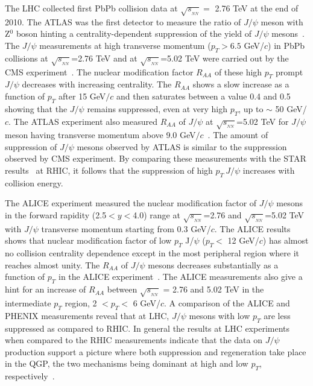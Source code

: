 \documentclass[12pt,a4paper,final]{iopart} %
\newcommand{\Jpsi}{J/\psi}
\newcommand{\pT}{p_{T}}
\newcommand{\sNN}{\sqrt{s_{_{NN}}}}
\begin{document}
The LHC collected first PbPb collision data at $\sNN =$ 2.76 TeV at the end of 2010.
The ATLAS was the first detector to measure 
the ratio of $\Jpsi$ meson with Z$^{0}$ boson hinting a centrality-dependent suppression
of the yield of $\Jpsi$ mesons~\cite{Aad:2010aa}.
 The $\Jpsi$ measurements at high transverse momentum ($p_T>6.5$ GeV/$c$) in PbPb collisions at $\sNN$=2.76 TeV and at
$\sNN$=5.02 TeV were carried out by the CMS experiment~\cite{Chatrchyan:2012np,Khachatryan:2016ypw,Sirunyan:2017isk}.
The nuclear modification factor $R_{AA}$ of these high $p_T$ prompt $\Jpsi$ decreases
with increasing centrality. The $R_{AA}$ shows a slow increase as a function of
$p_T$ after 15 GeV$/c$ and then saturates between a value 0.4 and 0.5 showing that the $\Jpsi$
remains suppressed, even at very high $p_T$, up to $\sim$ 50 GeV/$c$. The ATLAS experiment
also measured $R_{AA}$ of $\Jpsi$ at $\sNN$=5.02 TeV for $\Jpsi$ meson having
transverse momentum above 9.0 GeV$/c$~\cite{ATLAS:2016qpn}. The amount 
of suppression of $\Jpsi$ mesons observed by ATLAS is similar to the suppression
observed by CMS experiment. By comparing these measurements with the STAR
results~\cite{Tang:2011kr} at RHIC, it follows that the suppression of high $p_T~\Jpsi$
increases with collision energy.


  The ALICE experiment measured the nuclear modification factor of $\Jpsi$ mesons 
in the forward rapidity (2.5$<y<$4.0) range at $\sNN$=2.76 and $\sNN$=5.02 
TeV~\cite{Abelev:2013ila,Adam:2016rdg} with $\Jpsi$ transverse momentum starting from
0.3 GeV/$c$.
The ALICE results shows that nuclear modification factor of
low $\pT$ J/$\psi$ ($\pT<$ 12 GeV/$c$) has almost no collision centrality dependence 
except in the most peripheral region where it reaches almost unity.
The $R_{AA}$ of $\Jpsi$ mesons decreases substantially as a function of $\pT$ 
in the ALICE experiment~\cite{Abelev:2013ila,Adam:2016rdg}. The ALICE measurements also
give a hint for an increase of $R_{AA}$ between $\sNN$ = 2.76 and 5.02 TeV in the intermediate
$\pT$ region, 2 $< \pT < $ 6 GeV/$c$. A comparison of 
the ALICE and PHENIX measurements reveal that at LHC, $\Jpsi$ mesons with low $p_T$ are less
suppressed as compared to RHIC. In general the results at LHC experiments when 
compared to the RHIC measurements indicate that the data on $\Jpsi$ production support a 
picture where both suppression and regeneration take place in the QGP, 
the two mechanisms being dominant at high and low $\pT$, respectively~\cite{P.ShuklaforCMS:2014vna,Kumar:2014kfa}.
\end{document}
